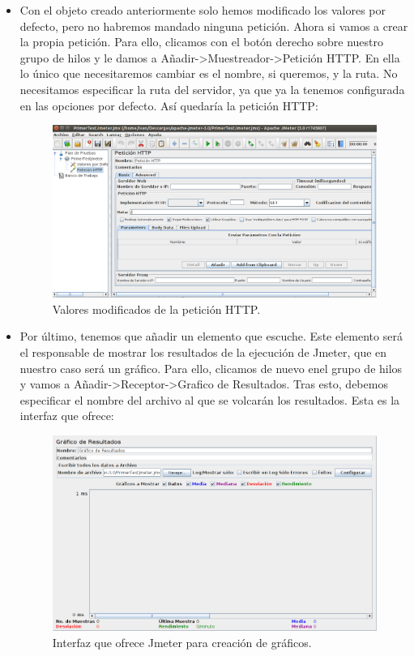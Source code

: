 \begin{itemize}
\begin{itemize}
		\item Con el objeto creado anteriormente solo hemos modificado los valores por defecto, pero no habremos mandado ninguna petición. Ahora si vamos a crear la propia petición. Para ello, clicamos con el botón derecho sobre nuestro grupo de hilos y le damos a Añadir->Muestreador->Petición HTTP. En ella lo único que necesitaremos cambiar es el nombre, si queremos, y la ruta. No necesitamos especificar la ruta del servidor, ya que ya la tenemos configurada en las opciones por defecto. Así quedaría la petición HTTP:\\
		
		\begin{figure}[H]
			\centering
			\includegraphics[width=0.7\linewidth]{PeticionHTTP}
			\caption[Petición HTTP]{Valores modificados de la petición HTTP.}
			\label{fig:PeticionHTTP}
		\end{figure}
		
		\item Por último, tenemos que añadir un elemento que escuche. Este elemento será el responsable de mostrar los resultados de la ejecución de Jmeter, que en nuestro caso será un gráfico. Para ello, clicamos de nuevo enel grupo de hilos y vamos a Añadir->Receptor->Grafico de Resultados. Tras esto, debemos especificar el nombre del archivo al que se volcarán los resultados. Esta es la interfaz que ofrece:\\
		\begin{figure}[H]
			\centering
			\includegraphics[width=0.7\linewidth]{GraficosJmeter}
			\caption[Interfaz Gráficos]{Interfaz que ofrece Jmeter para creación de gráficos.}
			\label{fig:GráficosJmeter}
		\end{figure}
		

\end{itemize}
\end{itemize}
